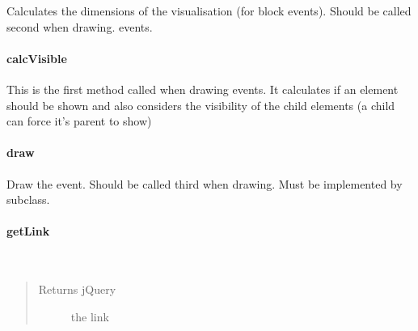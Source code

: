 \documentclass[letterpaper,10pt,english]{sphinxmanual}
\begin{document}
Calculates the dimensions of the visualisation (for block events). Should be called second when drawing.
events.


\paragraph{calcVisible}
\label{ambrosia_web.event.Event:calcvisible}

\begin{fulllineitems}
\label{ambrosia_web.event.Event:ambrosia_web.event.Event.calcVisible}
\end{fulllineitems}


This is the first method called when drawing events. It calculates if an element should be shown and also
considers the visibility of the child elements (a child can force it's parent to show)


\paragraph{draw}
\label{ambrosia_web.event.Event:draw}

\begin{fulllineitems}
\label{ambrosia_web.event.Event:ambrosia_web.event.Event.draw}
\end{fulllineitems}


Draw the event. Should be called third when drawing. Must be implemented by subclass.


\paragraph{getLink}
\label{ambrosia_web.event.Event:getlink}

\begin{fulllineitems}
\label{ambrosia_web.event.Event:ambrosia_web.event.Event.getLink}~\begin{quote}\begin{description}
\item[{Returns jQuery}] \leavevmode
the link

\end{description}\end{quote}

\end{fulllineitems}
\end{document}
